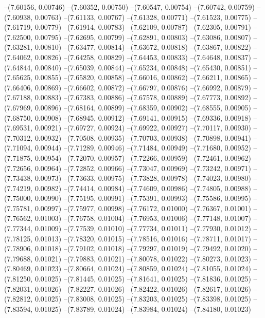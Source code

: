 --(7.60156, 0.00746)
--(7.60352, 0.00750)
--(7.60547, 0.00754)
--(7.60742, 0.00759)
--(7.60938, 0.00763)
--(7.61133, 0.00767)
--(7.61328, 0.00771)
--(7.61523, 0.00775)
--(7.61719, 0.00779)
--(7.61914, 0.00783)
--(7.62109, 0.00787)
--(7.62305, 0.00791)
--(7.62500, 0.00795)
--(7.62695, 0.00799)
--(7.62891, 0.00803)
--(7.63086, 0.00807)
--(7.63281, 0.00810)
--(7.63477, 0.00814)
--(7.63672, 0.00818)
--(7.63867, 0.00822)
--(7.64062, 0.00826)
--(7.64258, 0.00829)
--(7.64453, 0.00833)
--(7.64648, 0.00837)
--(7.64844, 0.00840)
--(7.65039, 0.00844)
--(7.65234, 0.00848)
--(7.65430, 0.00851)
--(7.65625, 0.00855)
--(7.65820, 0.00858)
--(7.66016, 0.00862)
--(7.66211, 0.00865)
--(7.66406, 0.00869)
--(7.66602, 0.00872)
--(7.66797, 0.00876)
--(7.66992, 0.00879)
--(7.67188, 0.00883)
--(7.67383, 0.00886)
--(7.67578, 0.00889)
--(7.67773, 0.00892)
--(7.67969, 0.00896)
--(7.68164, 0.00899)
--(7.68359, 0.00902)
--(7.68555, 0.00905)
--(7.68750, 0.00908)
--(7.68945, 0.00912)
--(7.69141, 0.00915)
--(7.69336, 0.00918)
--(7.69531, 0.00921)
--(7.69727, 0.00924)
--(7.69922, 0.00927)
--(7.70117, 0.00930)
--(7.70312, 0.00932)
--(7.70508, 0.00935)
--(7.70703, 0.00938)
--(7.70898, 0.00941)
--(7.71094, 0.00944)
--(7.71289, 0.00946)
--(7.71484, 0.00949)
--(7.71680, 0.00952)
--(7.71875, 0.00954)
--(7.72070, 0.00957)
--(7.72266, 0.00959)
--(7.72461, 0.00962)
--(7.72656, 0.00964)
--(7.72852, 0.00966)
--(7.73047, 0.00969)
--(7.73242, 0.00971)
--(7.73438, 0.00973)
--(7.73633, 0.00975)
--(7.73828, 0.00978)
--(7.74023, 0.00980)
--(7.74219, 0.00982)
--(7.74414, 0.00984)
--(7.74609, 0.00986)
--(7.74805, 0.00988)
--(7.75000, 0.00990)
--(7.75195, 0.00991)
--(7.75391, 0.00993)
--(7.75586, 0.00995)
--(7.75781, 0.00997)
--(7.75977, 0.00998)
--(7.76172, 0.01000)
--(7.76367, 0.01001)
--(7.76562, 0.01003)
--(7.76758, 0.01004)
--(7.76953, 0.01006)
--(7.77148, 0.01007)
--(7.77344, 0.01009)
--(7.77539, 0.01010)
--(7.77734, 0.01011)
--(7.77930, 0.01012)
--(7.78125, 0.01013)
--(7.78320, 0.01015)
--(7.78516, 0.01016)
--(7.78711, 0.01017)
--(7.78906, 0.01018)
--(7.79102, 0.01018)
--(7.79297, 0.01019)
--(7.79492, 0.01020)
--(7.79688, 0.01021)
--(7.79883, 0.01021)
--(7.80078, 0.01022)
--(7.80273, 0.01023)
--(7.80469, 0.01023)
--(7.80664, 0.01024)
--(7.80859, 0.01024)
--(7.81055, 0.01024)
--(7.81250, 0.01025)
--(7.81445, 0.01025)
--(7.81641, 0.01025)
--(7.81836, 0.01025)
--(7.82031, 0.01026)
--(7.82227, 0.01026)
--(7.82422, 0.01026)
--(7.82617, 0.01026)
--(7.82812, 0.01025)
--(7.83008, 0.01025)
--(7.83203, 0.01025)
--(7.83398, 0.01025)
--(7.83594, 0.01025)
--(7.83789, 0.01024)
--(7.83984, 0.01024)
--(7.84180, 0.01023)
